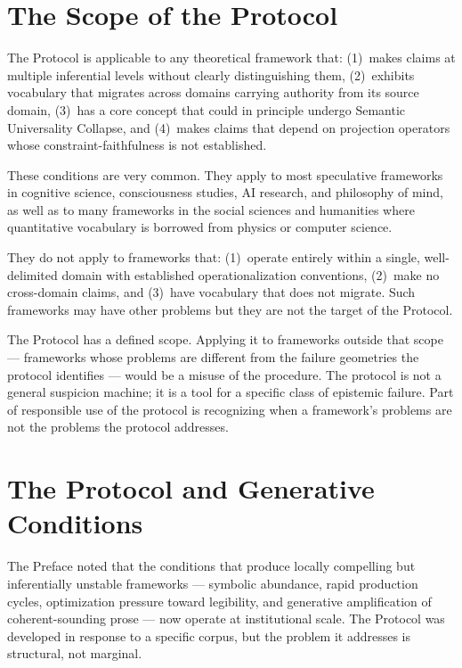 \section{The Scope of the Protocol}
\label{sec:protocol-scope}

The \Ortyx{} Protocol is applicable to any theoretical
framework that: (1)~makes claims at multiple inferential
levels without clearly distinguishing them, (2)~exhibits
vocabulary that migrates across domains carrying authority
from its source domain, (3)~has a core concept that
could in principle undergo Semantic Universality Collapse,
and (4)~makes claims that depend on projection operators
whose constraint-faithfulness is not established.

These conditions are very common. They apply to most
speculative frameworks in cognitive science, consciousness
studies, AI research, and philosophy of mind, as well
as to many frameworks in the social sciences and
humanities where quantitative vocabulary is borrowed
from physics or computer science.

They do not apply to frameworks that: (1)~operate
entirely within a single, well-delimited domain with
established operationalization conventions, (2)~make
no cross-domain claims, and (3)~have vocabulary that
does not migrate. Such frameworks may have other problems
but they are not the target of the \Ortyx{} Protocol.

\begin{auditprop}
\label{ap:scope-limitation}
The \Ortyx{} Protocol has a defined scope. Applying
it to frameworks outside that scope --- frameworks
whose problems are different from the failure geometries
the protocol identifies --- would be a misuse of the
procedure. The protocol is not a general suspicion
machine; it is a tool for a specific class of epistemic
failure. Part of responsible use of the protocol is
recognizing when a framework's problems are not the
problems the protocol addresses.
\end{auditprop}

\section{The Protocol and Generative Conditions}
\label{sec:generative-conditions}

The Preface noted that the conditions that produce
locally compelling but inferentially unstable frameworks
--- symbolic abundance, rapid production cycles,
optimization pressure toward legibility, and generative
amplification of coherent-sounding prose --- now operate
at institutional scale. The \Ortyx{} Protocol was
developed in response to a specific corpus, but the
problem it addresses is structural, not marginal.

